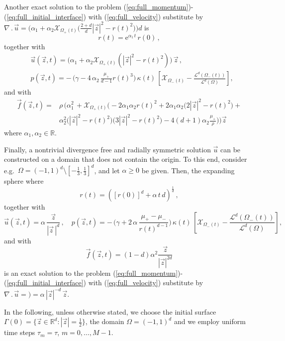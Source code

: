 \documentclass[a4paper,12pt,onecolumn]{article}
\newcommand{\R}{{\mathbb R}}
\newcommand{\bigchi}{\ensuremath{\mathrm{\mathcal{X}}}}
\newcommand{\charfcn}[1]{\bigchi_{#1}} %
\begin{document}
Another exact solution to the problem
(\ref{eq:full_momentum})-(\ref{eq:full_initial_interface}) with
(\ref{eq:full_velocity}) substitute by $\nabla\,.\,\vec u = \big( \alpha_1 +
\alpha_2\charfcn{\Omega_+(t)}\big(\frac{2+d}{d}|\vec z|^2-r(t)^2\big)\big)d$ is
\begin{equation} \label{eq:r_benchmark2}
r(t) = \mathrm{e}^{\alpha_1\,t}\,r(0)\,,
\end{equation}
together with
\begin{align} \label{eq:up_benchmark2}
& \vec u(\vec z, t) = \bigg(\alpha_1+\alpha_2\charfcn{\Omega_+(t)}(|\vec
z|^2-r(t)^2)\bigg)\,\vec z\,, \\
& p(\vec z, t) = -\,\bigg(\gamma - 4\,\alpha_2\,\frac{\mu_+}{d-1}r(t)^3
\bigg)\,\kappa(t)\,\left[ \charfcn{\Omega_-(t)} -
\frac{\mathcal{L}^d(\Omega_-(t))}{\mathcal{L}^d(\Omega)}\right],
\end{align}
and with
\begin{align}
\vec f(\vec z, t) = &
\rho\,\bigg(\alpha_1^2\,+\charfcn{\Omega_+(t)}\bigg(-2\alpha_1\alpha_2r(t)^2 +
2\alpha_1\alpha_2\big(2|\vec z|^2-r(t)^2\big)+ \nonumber \\
& \alpha_2^2\big(|\vec z|^2-r(t)^2\big)\big(3|\vec z|^2 -
r(t)^2\big)-4(d+1)\alpha_2\frac{\mu_+}{\rho}\bigg)\bigg)\vec z
\end{align}
where $\alpha_1,\alpha_2 \in \R$.

Finally, a nontrivial divergence free and radially symmetric
solution $\vec u$ can be constructed on a domain that does not contain the
origin. To this end, consider e.g.\ $\Omega = (-1,1)^d \setminus [-\frac13,
\frac13]^d$, and let $\alpha \geq 0$ be given. Then, the expanding sphere where
\begin{equation} \label{eq:r_benchmark3}
r(t) = ([r(0)]^d + \alpha\,t\,d)^\frac1d \,,
\end{equation}
together with
\begin{equation} \label{eq:up_benchmark3}
\vec u(\vec z, t) = \alpha\,\frac{\vec z}{|\vec z\,|^d}\,, \quad
p(\vec z, t) = -\,\bigg(\gamma +2\,\alpha\,\frac{\mu_+ - \mu_-}
{r(t)^{d-1}}\bigg)\,\kappa(t)\,\left[ \charfcn{\Omega_-(t)} -
\frac{\mathcal{L}^d(\Omega_-(t))}{\mathcal{L}^d(\Omega)}\right],
\end{equation}
and with
\begin{equation}
\vec f(\vec z, t) = (1-d)\alpha^2\frac{\vec z}{|\vec z|^{2d}}
\end{equation}
is an exact solution to the problem
(\ref{eq:full_momentum})-(\ref{eq:full_initial_interface}) with
(\ref{eq:full_velocity}) substitute by $\nabla\,.\,\vec u =) = \alpha\,|\vec
z|^{-d}\,\vec z$.

In the following, unless otherwise stated, we choose the initial surface
$\Gamma(0) = \{ \vec z \in \R^d : |\vec z| = \frac12 \}$, the domain
$\Omega = (-1,1)^d$ and we employ uniform time steps $\tau_m=\tau$,
$m=0,\ldots, M-1$.



\end{document}
